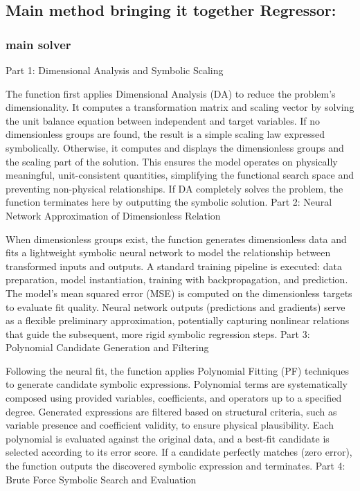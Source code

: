 \documentclass{article}
\begin{document}
\subsection{Main method bringing it together Regressor: }

\subsubsection{main solver}

Part 1: Dimensional Analysis and Symbolic Scaling

The function first applies Dimensional Analysis (DA) to reduce the problem’s dimensionality. It computes a transformation matrix and scaling vector by solving the unit balance equation between independent and target variables. If no dimensionless groups are found, the result is a simple scaling law expressed symbolically. Otherwise, it computes and displays the dimensionless groups and the scaling part of the solution. This ensures the model operates on physically meaningful, unit-consistent quantities, simplifying the functional search space and preventing non-physical relationships. If DA completely solves the problem, the function terminates here by outputting the symbolic solution.
Part 2: Neural Network Approximation of Dimensionless Relation

When dimensionless groups exist, the function generates dimensionless data and fits a lightweight symbolic neural network to model the relationship between transformed inputs and outputs. A standard training pipeline is executed: data preparation, model instantiation, training with backpropagation, and prediction. The model’s mean squared error (MSE) is computed on the dimensionless targets to evaluate fit quality. Neural network outputs (predictions and gradients) serve as a flexible preliminary approximation, potentially capturing nonlinear relations that guide the subsequent, more rigid symbolic regression steps.
Part 3: Polynomial Candidate Generation and Filtering

Following the neural fit, the function applies Polynomial Fitting (PF) techniques to generate candidate symbolic expressions. Polynomial terms are systematically composed using provided variables, coefficients, and operators up to a specified degree. Generated expressions are filtered based on structural criteria, such as variable presence and coefficient validity, to ensure physical plausibility. Each polynomial is evaluated against the original data, and a best-fit candidate is selected according to its error score. If a candidate perfectly matches (zero error), the function outputs the discovered symbolic expression and terminates.
Part 4: Brute Force Symbolic Search and Evaluation
\end{document}

